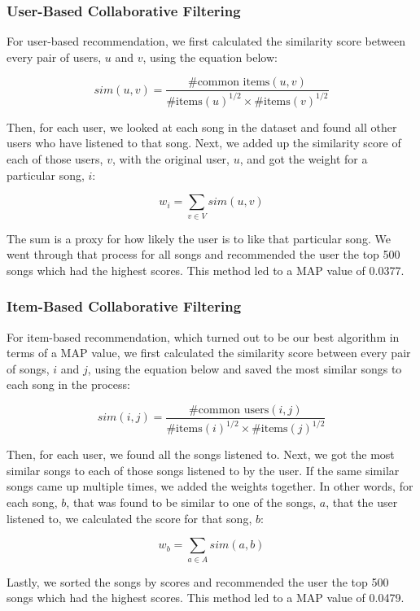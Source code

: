 \documentclass[12pt,preprint]{aastex}
\begin{document}
\subsubsection{User-Based Collaborative Filtering}
For user-based recommendation, we first calculated the similarity score between every pair of users, $u$ and $v$, using the equation below:

\begin{equation}
sim(u,v) = \frac{\text{\# common items}(u, v)}{{\text{\# items}(u)}^{1/2} \times {\text{\# items}(v)}^{1/2}}
\end{equation}

Then, for each user, we looked at each song in the dataset and found all other users who have listened to that song. Next, we added up the similarity score of each of those users, $v$, with the original user, $u$, and got the weight for a particular song, $i$:  

$$w_i = \sum_{v \in V} sim(u, v)$$

The sum is a proxy for how likely the user is to like that particular song. We went through that process for all songs and recommended the user the top 500 songs which had the highest scores. This method led to a MAP value of 0.0377.

\subsubsection{Item-Based Collaborative Filtering}
For item-based recommendation, which turned out to be our best algorithm in terms of a MAP value, we first calculated the similarity score between every pair of songs, $i$ and $j$, using the equation below and saved the most similar songs to each song in the process:

\begin{equation}
sim(i,j) = \frac{\text{\# common users}(i, j)}{{\text{\# items}(i)}^{1/2} \times {\text{\# items}(j)}^{1/2}}
\end{equation}

Then, for each user, we found all the songs listened to. Next, we got the most similar songs to each of those songs listened to by the user. If the same similar songs came up multiple times, we added the weights together. In other words, for each song, $b$, that was found to be similar to one of the songs, $a$, that the user listened to, we calculated the score for that song, $b$:

$$w_b = \sum_{a \in A} sim(a, b)$$

Lastly, we sorted the songs by scores and recommended the user the top 500 songs which had the highest scores. This method led to a MAP value of 0.0479.
\end{document}
